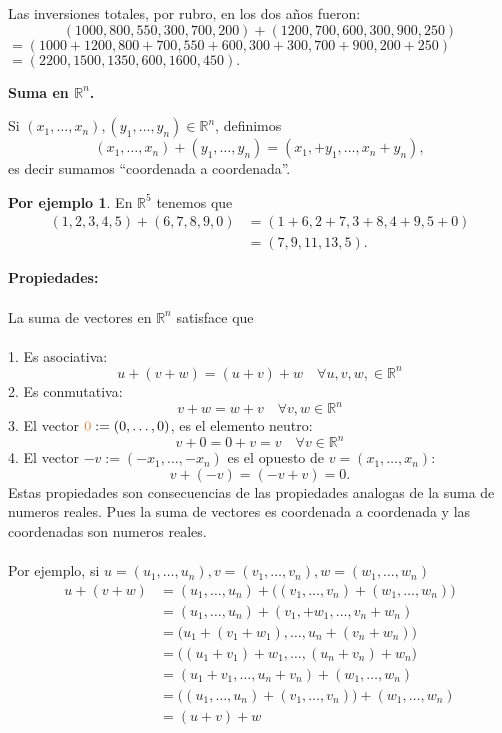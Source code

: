 \documentclass{article}
\theoremstyle{definition}
\theoremstyle{definition}
\newtheorem*{ej}{Por ejemplo}
\theoremstyle{remark}
\begin{document}
Las inversiones totales, por rubro, en los dos años fueron:\[
(1000,800,550,300,700,200)+(1200,700,600,300,900,250)
\]
$=(1000+1200,800+700,550+600,300+300,700+900,200+250)$\\
$=(2200,1500,1350,600,1600,450).$
\begin{center}
  \textbf{Suma en $\mathbb{R}^n$.}
\end{center}
\begin{defi}
  Si $(x_1,\dots,x_n),(y_1,\dots,y_n)\in \mathbb{R}^n$, definimos \[
    (x_1,\dots,x_n)+(y_1,\dots,y_n)=(x_1,+y_1,\dots,x_n+y_n),
  \] es decir sumamos ``coordenada a coordenada''.
\end{defi}
\begin{ej}
  En $\mathbb{R}^5$ tenemos que \[
    \begin{aligned}
      (1,2,3,4,5)+(6,7,8,9,0)&=(1+6,2+7,3+8,4+9,5+0) \\
                             &=(7,9,11,13,5).
    \end{aligned}
  \]
\end{ej}
\textbf{Propiedades:}\\\\
La suma de vectores en $\mathbb{R}^n$ satisface que \\\\
\textcolor{azulp2}{1.} Es asociativa: \[
  u+(v+w)=(u+v)+w\quad \forall u,v,w, \in \mathbb{R}^n
\]
\textcolor{azulp2}{2.} Es conmutativa: \[
  v+w=w+v \quad \forall v,w \in \mathbb{R}^n
\]
\textcolor{azulp2}{3.} El vector $\textcolor{rojop2}{0}:=(0,\dots,0)$, es el elemento \textcolor{rojop2}{neutro}:
\[
  v+0=0+v=v \quad \forall v \in \mathbb{R}^n
\]
\textcolor{azulp2}{4.} El vector \textcolor{rojop2}{$-v:=(-x_1,\dots,-x_n)$} es el \textcolor{rojop2}{opuesto} de $v=(x_1,\dots,x_n)$:\[
v+(-v)=(-v+v)=0.
\]
Estas propiedades son consecuencias de las propiedades analogas de la suma de numeros reales. Pues la suma de vectores es coordenada a coordenada y las coordenadas son numeros reales.
\\\\
Por ejemplo, si $u=(u_1,\dots,u_n), v=(v_1,\dots,v_n),w=(w_1,\dots,w_n)$ \[
  \begin{aligned}
    u+(v+w)&=(u_1,\dots,u_n)+\big((v_1,\dots,v_n)+(w_1,\dots,w_n)\big) \\
           &=(u_1,\dots,u_n)+(v_1,+w_1,\dots,v_n+w_n) \\
           &= \Big(u_1+(v_1+w_1),\dots,u_n+(v_n+w_n)\Big)\\
           &= \Big((u_1+v_1)+w_1,\dots,(u_n+v_n)+w_n\Big) \\
           &=(u_1+v_1,\dots,u_n+v_n)+(w_1,\dots,w_n) \\
           &=\Big((u_1,\dots,u_n)+(v_1,\dots,v_n)\Big)+(w_1,\dots,w_n)\\
           &=(u+v)+w
  \end{aligned}
\]
\end{document}
